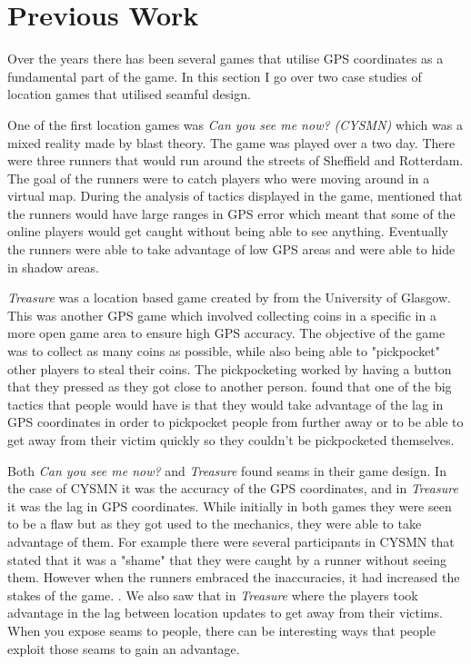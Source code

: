 \documentclass{l4proj}
\begin{document}
\section{Previous Work}

Over the years there has been several games that utilise GPS coordinates as a fundamental part of the game. In this section I go over two case
studies of location games that utilised seamful design.

One of the first location games was \emph{Can you see me now? (CYSMN)} which was a mixed reality made by blast theory. \citep{canyouseeme} The
game was played over a two day. There were three runners that would run around the streets of Sheffield
and Rotterdam. The goal of the runners were to catch players who were moving around in a virtual map. During the analysis of tactics displayed in the game,
\cite{canyouseeme} mentioned that the runners would have large ranges in GPS error which meant that some of the online players would get
caught without being able to see anything. Eventually the runners were able to take advantage of low GPS areas and were able to hide in shadow
areas.

\emph{Treasure} was a location based game created by \cite{Barkhuus2005} from the University of Glasgow. This was another GPS game which involved
collecting coins in a specific in a more open game area to ensure high GPS accuracy. The objective of the
game was to collect as many coins as possible, while also being able to "pickpocket" other players to steal their
coins. The pickpocketing worked by having a button that they pressed as they got close to another person. \cite{Barkhuus2005}
found that one of the big tactics that people would have is that they would take advantage of the lag in GPS coordinates
in order to pickpocket people from further away or to be able to get away from their victim quickly so they couldn't be
pickpocketed themselves.

Both \emph{Can you see me now?} and \emph{Treasure} found seams in their game design. In the case of CYSMN it was the accuracy
of the GPS coordinates, and in \emph{Treasure} it was the lag in GPS coordinates. While initially in both games they were seen
to be a flaw but as they got used to the mechanics, they were able to take advantage of them. For example there were several participants in 
CYSMN that stated that it was a "shame" that they were caught by a runner without seeing them. However when the runners embraced the inaccuracies,
it had increased the stakes of the game. \citep{canyouseeme}. We also saw that in \emph{Treasure} where the players took 
advantage in the lag between location updates to get away from their victims. When you expose seams to people, there can
be interesting ways that people exploit those seams to gain an advantage.
\end{document}
